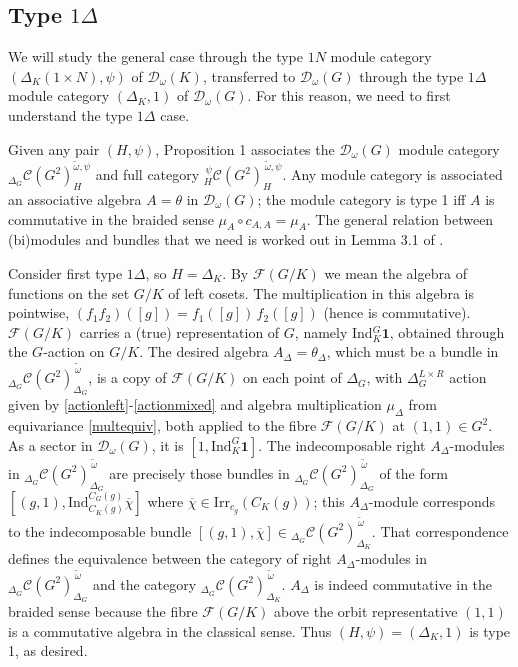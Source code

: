 \documentclass[12pt]{article}
\numberwithin{equation}{section}
\def\cC            {{\mathcal{C}}}
\def\cD            {{\mathcal{D}}}
\def\cF            {{\mathcal{F}}}
\begin{document}
\subsection{Type $1\Delta$}

We will study the general case through the type $1N$ module category $(\Delta_K(1\times N),\psi)$ of $\cD_\omega(K)$, transferred to $\cD_\omega(G)$ through the
type $1\Delta$ module category $(\Delta_K,1)$ of $\cD_\omega(G)$. For this reason, we need to first understand the type $1\Delta$ case.


Given any pair $(H,\psi)$, Proposition 1 associates the $\cD_\omega(G)$ module category  ${}_{\Delta_G}\cC(G^2)^{\tilde{\omega},\psi}_H$ and  full category  ${}_H^{\,\psi}\cC(G^2)^{\,\tilde{\omega},\psi}_H$. Any module category is associated
an associative algebra $A=\theta$ in $\cD_\omega(G)$; the module category is type 1 iff $A$ is commutative in the braided sense $\mu_A\circ c_{A,A}=\mu_A$.  
The general relation between (bi)modules and bundles that we need is worked out in
Lemma 3.1 of \cite{EP1}.


Consider first type $1\Delta$, so
$H=\Delta_K$. By $\cF(G/K)$ we mean the algebra of functions on the set $G/K$ of left cosets. The multiplication in this algebra is 
pointwise, $(f_1f_2)([g])=f_1([g])\,f_2([g])$ (hence is commutative). $\cF(G/K)$ carries a (true) representation of $G$, namely
Ind$_K^G\mathbf{1}$, obtained through the $G$-action on $G/K$. The desired algebra $A_\Delta=\theta_\Delta$, which must be a bundle in ${}_{\Delta_G}\cC(G^2)^{\,\tilde{\omega}}_{\Delta_G}$, is a copy of $\cF(G/K)$ on each point of $\Delta_G$,
with $\Delta_G^{L\times R}$ action given by \eqref{actionleft}-\eqref{actionmixed} and algebra multiplication $\mu_\Delta$ from equivariance \eqref{multequiv}, both applied to the fibre $\cF(G/K)$ at $(1,1)\in G^2$.
As a sector in $\cD_\omega(G)$, it is $[1,\mathrm{Ind}_K^G\mathbf{1}]$.
The indecomposable right $A_\Delta$-modules in ${}_{\Delta_G}\cC(G^2)_{\Delta_G}^{\,\tilde{\omega}}$ are precisely those bundles in ${}_{\Delta_G}\cC(G^2)^{\,\tilde{\omega}}_{\Delta_G}$ of the form $[(g,1), \mathrm{Ind}_{C_K(g)}^{C_G(g)}\overline{\chi}]$ where $\overline{\chi}\in\mathrm{Irr}_{c_g}(C_K(g))$; 
 this $A_\Delta$-module corresponds to the indecomposable  bundle $[(g,1),\overline{\chi}]\in{}_{\Delta_G}\cC(G^2)^{\,\tilde{\omega}}_{ \Delta_K}$. That correspondence defines the equivalence between the category of right $A_\Delta$-modules in ${}_{\Delta_G}\cC(G^2)_{\Delta_G}^{\,\tilde{\omega}}$ and the category ${}_{\Delta_G}\cC(G^2)^{\,\tilde{\omega}}_{\Delta_K}$.
 $A_\Delta$ is indeed commutative in the braided sense because the fibre $\cF(G/K)$ above the orbit representative $(1,1)$  is a commutative algebra in the classical sense. Thus  $(H,\psi)=(\Delta_K,1)$ is  type 1, as desired.
\end{document}
